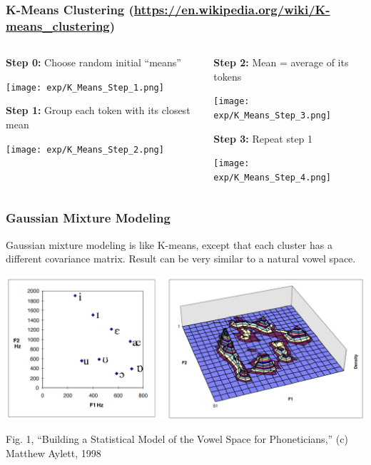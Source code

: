 \documentclass{beamer}
\begin{document}
\begin{frame}
  \frametitle{K-Means Clustering {\tiny (\url{https://en.wikipedia.org/wiki/K-means_clustering})}}
  \begin{columns}
    \begin{column}{0.5\textwidth}
      {\bf Step 0:} Choose random initial ``means''
      \centerline{\texttt{[image: exp/K\_Means\_Step\_1.png]}}

      {\bf Step 1:} Group each token with its closest mean
      \centerline{\texttt{[image: exp/K\_Means\_Step\_2.png]}}
    \end{column}
    \begin{column}{0.5\textwidth}
      {\bf Step 2:} Mean = average of its tokens
      \centerline{\texttt{[image: exp/K\_Means\_Step\_3.png]}}

      {\bf Step 3:} Repeat step 1
      \centerline{\texttt{[image: exp/K\_Means\_Step\_4.png]}}
    \end{column}
  \end{columns}
\end{frame}

\begin{frame}
  \frametitle{Gaussian Mixture Modeling}

  Gaussian mixture modeling is like K-means, except that each cluster
  has a different covariance matrix.  Result can be very similar to a
  natural vowel space.

  \begin{center}
    \includegraphics[width=\textwidth]{figs/aylett1998fig1.png}

    \begin{tiny}
      Fig. 1, ``Building a Statistical Model of the Vowel Space for Phoneticians,''
      (c) Matthew Aylett, 1998
    \end{tiny}
  \end{center}
\end{frame}

\end{document}
